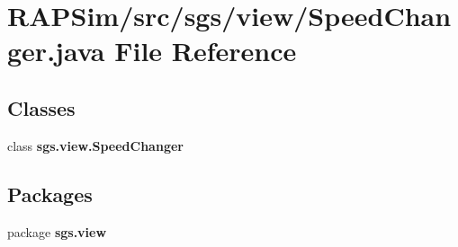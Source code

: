 \section{R\-A\-P\-Sim/src/sgs/view/\-Speed\-Changer.java File Reference}
\label{_speed_changer_8java}
\subsection*{Classes}
\begin{DoxyCompactItemize}
\item 
class {\bf sgs.\-view.\-Speed\-Changer}
\end{DoxyCompactItemize}
\subsection*{Packages}
\begin{DoxyCompactItemize}
\item 
package {\bf sgs.\-view}
\end{DoxyCompactItemize}
